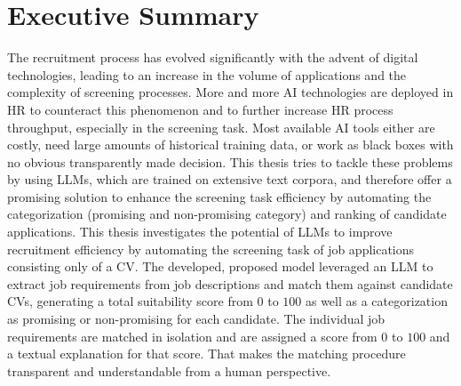 \documentclass[draft,final]{thesisclass} %
\begin{document}

\tableofcontents %

\chapter{Executive Summary}
The recruitment process has evolved significantly with the advent of digital technologies, leading to an increase in the volume of applications and the complexity of screening processes. More and more \acs{AI} technologies are deployed in \acs{HR} to counteract this phenomenon and to further increase \acs{HR} process throughput, especially in the screening task. Most available \acs{AI} tools either are costly, need large amounts of historical training data, or work as black boxes with no obvious transparently made decision. This thesis tries to tackle these problems by using \gls{LLM}s, which are trained on extensive text corpora, and therefore offer a promising solution to enhance the screening task efficiency by automating the categorization (promising and non-promising category) and ranking of candidate applications. This thesis investigates the potential of \gls{LLM}s to improve recruitment efficiency by automating the screening task of job applications consisting only of a \acs{CV}. The developed, proposed model leveraged an \gls{LLM} to extract job requirements from job descriptions and match them against candidate \acs{CV}s, generating a total suitability score from $0$ to $100$ as well as a categorization as promising or non-promising for each candidate. The individual job requirements are matched in isolation and are assigned a score from $0$ to $100$ and a textual explanation for that score. That makes the matching procedure transparent and understandable from a human perspective.
\end{document}
